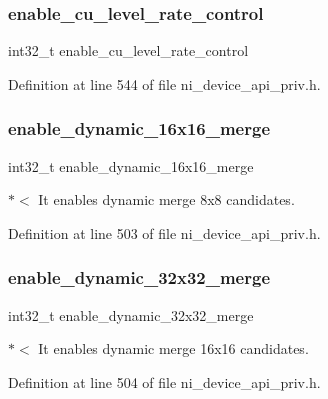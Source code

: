 \subsubsection{\texorpdfstring{enable\_cu\_level\_rate\_control}{enable\_cu\_level\_rate\_control}}
{\footnotesize\ttfamily int32\+\_\+t enable\+\_\+cu\+\_\+level\+\_\+rate\+\_\+control}



Definition at line 544 of file ni\+\_\+device\+\_\+api\+\_\+priv.\+h.

\mbox{\label{struct__ni__encoder__change__params__t_ac920a1f2e0c0830affc30cb7eaec9805}} 
\subsubsection{\texorpdfstring{enable\_dynamic\_16x16\_merge}{enable\_dynamic\_16x16\_merge}}
{\footnotesize\ttfamily int32\+\_\+t enable\+\_\+dynamic\+\_\+16x16\+\_\+merge}

$\ast$$<$ It enables dynamic merge 8x8 candidates. 

Definition at line 503 of file ni\+\_\+device\+\_\+api\+\_\+priv.\+h.

\mbox{\label{struct__ni__encoder__change__params__t_a2af2020cabdfd0b9a420075686ba0b11}} 
\subsubsection{\texorpdfstring{enable\_dynamic\_32x32\_merge}{enable\_dynamic\_32x32\_merge}}
{\footnotesize\ttfamily int32\+\_\+t enable\+\_\+dynamic\+\_\+32x32\+\_\+merge}

$\ast$$<$ It enables dynamic merge 16x16 candidates. 

Definition at line 504 of file ni\+\_\+device\+\_\+api\+\_\+priv.\+h.

